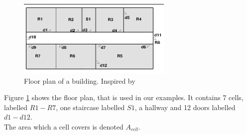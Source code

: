 \begin{figure}[]%
\centering
\includegraphics[width=0.8\columnwidth]{images/floorplan.png}%
\caption{Floor plan of a building. Inspired by~\cite{Jensen:2009:GMB:1590953.1591000}}%
\label{fig:floortplan}%
\end{figure}%

Figure \ref{fig:floortplan} shows the floor plan, that is used in our examples.
It contains 7 cells, labelled $R1 - R7$, one staircase labelled $S1$, a hallway and 12 doors labelled $d1-d12$. \\
The area which a cell covers is denoted $A_{cell}$.

